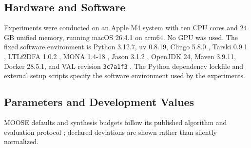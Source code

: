 \subsection{Hardware and Software}

Experiments were conducted on an Apple M4 system with ten CPU cores and 24 GB
unified memory, running macOS 26.4.1 on arm64. No GPU was used. The fixed
software environment is Python 3.12.7, uv 0.8.19, Clingo 5.8.0
\cite{Gebser2018Clingo}, Tarski 0.9.1 \cite{RamirezFrances2020Tarski},
LTLf2DFA 1.0.2 \cite{Fuggitti2020LTLf2DFA}, MONA 1.4-18
\cite{Henriksen1995MONA}, Jason 3.1.2 \cite{Bordini2007Jason}, OpenJDK 24,
Maven 3.9.11, Docker 28.5.1, and VAL revision \texttt{3c7a1f3}
\cite{Howey2004VAL}. The Python dependency lockfile and external setup scripts
specify the software environment used by the experiments.

\subsection{Parameters and Development Values}

MOOSE defaults and synthesis budgets follow its published algorithm and
evaluation protocol \cite{Chen2026Moose}; declared deviations are shown rather
than silently normalized.

